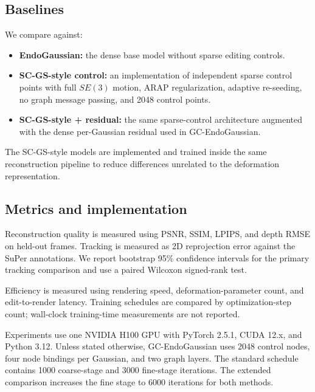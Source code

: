 \documentclass[AMA,Times1COL]{WileyNJDv5} %
\begin{document}
\subsection{Baselines}

We compare against:
\begin{itemize}
\item \textbf{EndoGaussian:} the dense base model without sparse editing controls.
\item \textbf{SC-GS-style control:} an implementation of independent sparse control points with full $SE(3)$ motion, ARAP regularization, adaptive re-seeding, no graph message passing, and 2048 control points.
\item \textbf{SC-GS-style + residual:} the same sparse-control architecture augmented with the dense per-Gaussian residual used in GC-EndoGaussian.
\end{itemize}

The SC-GS-style models are implemented and trained inside the same reconstruction pipeline to reduce differences unrelated to the deformation representation.

\subsection{Metrics and implementation}

Reconstruction quality is measured using PSNR, SSIM, LPIPS, and depth RMSE on held-out frames. Tracking is measured as 2D reprojection error against the SuPer annotations. We report bootstrap 95\% confidence intervals for the primary tracking comparison and use a paired Wilcoxon signed-rank test.

Efficiency is measured using rendering speed, deformation-parameter count, and edit-to-render latency. Training schedules are compared by optimization-step count; wall-clock training-time measurements are not reported.

Experiments use one NVIDIA H100 GPU with PyTorch 2.5.1, CUDA 12.x, and Python 3.12. Unless stated otherwise, GC-EndoGaussian uses 2048 control nodes, four node bindings per Gaussian, and two graph layers. The standard schedule contains 1000 coarse-stage and 3000 fine-stage iterations. The extended comparison increases the fine stage to 6000 iterations for both methods.
\end{document}
